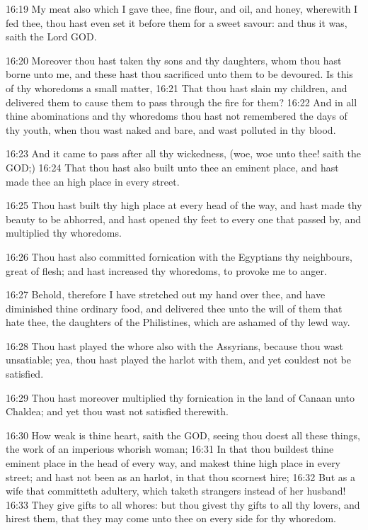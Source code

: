 16:19 My meat also which I gave thee, fine flour, and oil, and honey, wherewith I fed thee, thou hast even set it before them for a sweet savour: and thus it was, saith the Lord GOD.

16:20 Moreover thou hast taken thy sons and thy daughters, whom thou hast borne unto me, and these hast thou sacrificed unto them to be devoured. Is this of thy whoredoms a small matter, 16:21 That thou hast slain my children, and delivered them to cause them to pass through the fire for them?  16:22 And in all thine abominations and thy whoredoms thou hast not remembered the days of thy youth, when thou wast naked and bare, and wast polluted in thy blood.

16:23 And it came to pass after all thy wickedness, (woe, woe unto thee!  saith the \LORD GOD;) 16:24 That thou hast also built unto thee an eminent place, and hast made thee an high place in every street.

16:25 Thou hast built thy high place at every head of the way, and hast made thy beauty to be abhorred, and hast opened thy feet to every one that passed by, and multiplied thy whoredoms.

16:26 Thou hast also committed fornication with the Egyptians thy neighbours, great of flesh; and hast increased thy whoredoms, to provoke me to anger.

16:27 Behold, therefore I have stretched out my hand over thee, and have diminished thine ordinary food, and delivered thee unto the will of them that hate thee, the daughters of the Philistines, which are ashamed of thy lewd way.

16:28 Thou hast played the whore also with the Assyrians, because thou wast unsatiable; yea, thou hast played the harlot with them, and yet couldest not be satisfied.

16:29 Thou hast moreover multiplied thy fornication in the land of Canaan unto Chaldea; and yet thou wast not satisfied therewith.

16:30 How weak is thine heart, saith the \LORD GOD, seeing thou doest all these things, the work of an imperious whorish woman; 16:31 In that thou buildest thine eminent place in the head of every way, and makest thine high place in every street; and hast not been as an harlot, in that thou scornest hire; 16:32 But as a wife that committeth adultery, which taketh strangers instead of her husband!  16:33 They give gifts to all whores: but thou givest thy gifts to all thy lovers, and hirest them, that they may come unto thee on every side for thy whoredom.

